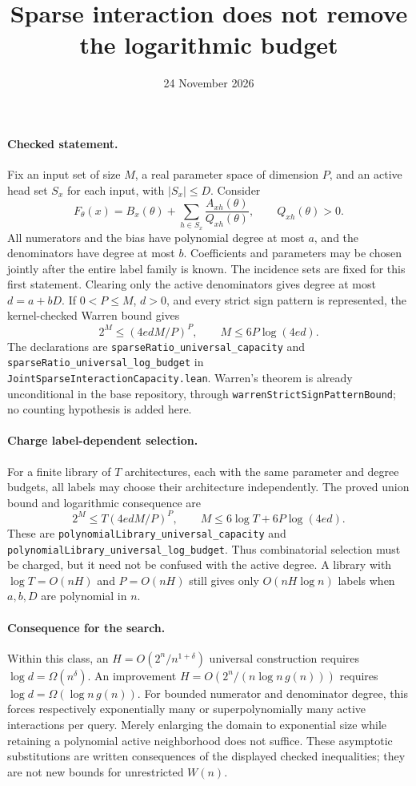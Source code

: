 \documentclass{article}
\begin{document}
\title{Sparse interaction does not remove the logarithmic budget}
\author{}\date{24 November 2026}\maketitle

\paragraph{Checked statement.}
Fix an input set of size $M$, a real parameter space of dimension $P$, and
an active head set $S_x$ for each input, with $|S_x|\le D$. Consider
\[
 F_\theta(x)=B_x(\theta)+\sum_{h\in S_x}
 \frac{A_{xh}(\theta)}{Q_{xh}(\theta)},
 \qquad Q_{xh}(\theta)>0.
\]
All numerators and the bias have polynomial degree at most $a$, and the
denominators have degree at most $b$. Coefficients and parameters may be
chosen jointly after the entire label family is known. The incidence sets
are fixed for this first statement. Clearing only the active denominators
gives degree at most $d=a+bD$. If $0<P\le M$, $d>0$, and every strict sign
pattern is represented, the kernel-checked Warren bound gives
\[
 2^M\le (4edM/P)^P,
 \qquad M\le 6P\log(4ed).
\]
The declarations are \texttt{sparseRatio\_universal\_capacity} and
\texttt{sparseRatio\_universal\_log\_budget} in
\texttt{JointSparseInteractionCapacity.lean}. Warren's theorem is already
unconditional in the base repository, through
\texttt{warrenStrictSignPatternBound}; no counting hypothesis is added here.

\paragraph{Charge label-dependent selection.}
For a finite library of $T$ architectures, each with the same parameter and
degree budgets, all labels may choose their architecture independently.
The proved union bound and logarithmic consequence are
\[
 2^M\le T(4edM/P)^P,
 \qquad M\le 6\log T+6P\log(4ed).
\]
These are \texttt{polynomialLibrary\_universal\_capacity} and
\texttt{polynomialLibrary\_universal\_log\_budget}. Thus combinatorial
selection must be charged, but it need not be confused with the active
degree. A library with $\log T=O(nH)$ and $P=O(nH)$ still gives only
$O(nH\log n)$ labels when $a,b,D$ are polynomial in $n$.

\paragraph{Consequence for the search.}
Within this class, an $H=O(2^n/n^{1+\delta})$ universal construction requires
$\log d=\Omega(n^\delta)$. An improvement
$H=O(2^n/(n\log n\,g(n)))$ requires
$\log d=\Omega(\log n\,g(n))$. For bounded numerator and denominator degree,
this forces respectively exponentially many or superpolynomially many
active interactions per query. Merely enlarging the domain to exponential
size while retaining a polynomial active neighborhood does not suffice.
These asymptotic substitutions are written consequences of the displayed
checked inequalities; they are not new bounds for unrestricted $W(n)$.
\end{document}
